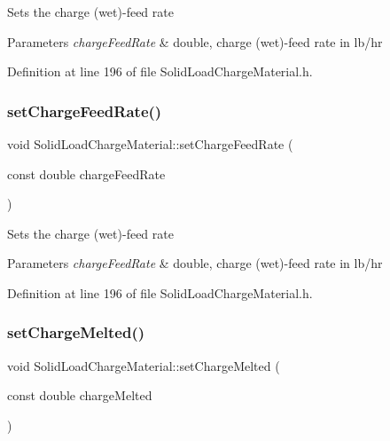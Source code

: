 Sets the charge (wet)-\/feed rate 
\begin{DoxyParams}{Parameters}
{\em charge\+Feed\+Rate} & double, charge (wet)-\/feed rate in lb/hr \\
\hline
\end{DoxyParams}


Definition at line 196 of file Solid\+Load\+Charge\+Material.\+h.

\mbox{\label{class_solid_load_charge_material_adc50117256b714789f68097437ca658d}} 
\subsubsection{\texorpdfstring{set\+Charge\+Feed\+Rate()}{setChargeFeedRate()}\hspace{0.1cm}{\footnotesize\ttfamily [3/3]}}
{\footnotesize\ttfamily void Solid\+Load\+Charge\+Material\+::set\+Charge\+Feed\+Rate (\begin{DoxyParamCaption}\item[{const double}]{charge\+Feed\+Rate }\end{DoxyParamCaption})\hspace{0.3cm}{\ttfamily [inline]}}

Sets the charge (wet)-\/feed rate 
\begin{DoxyParams}{Parameters}
{\em charge\+Feed\+Rate} & double, charge (wet)-\/feed rate in lb/hr \\
\hline
\end{DoxyParams}


Definition at line 196 of file Solid\+Load\+Charge\+Material.\+h.

\mbox{\label{class_solid_load_charge_material_a9999a2976e8a8662a86cc2a159df5202}} 
\subsubsection{\texorpdfstring{set\+Charge\+Melted()}{setChargeMelted()}\hspace{0.1cm}{\footnotesize\ttfamily [1/3]}}
{\footnotesize\ttfamily void Solid\+Load\+Charge\+Material\+::set\+Charge\+Melted (\begin{DoxyParamCaption}\item[{const double}]{charge\+Melted }\end{DoxyParamCaption})\hspace{0.3cm}{\ttfamily [inline]}}

